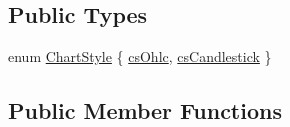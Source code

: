 \subsection*{Public Types}
\begin{DoxyCompactItemize}
\item 
enum \hyperlink{classQCPFinancial_a0f800e21ee98d646dfc6f8f89d10ebfb}{Chart\+Style} \{ \hyperlink{classQCPFinancial_a0f800e21ee98d646dfc6f8f89d10ebfba3a516016c9298d3e95dd82aa203c4390}{cs\+Ohlc}, 
\hyperlink{classQCPFinancial_a0f800e21ee98d646dfc6f8f89d10ebfbac803cbd39f26e3f206bcc7028679e62f}{cs\+Candlestick}
 \}
\end{DoxyCompactItemize}
\subsection*{Public Member Functions}

